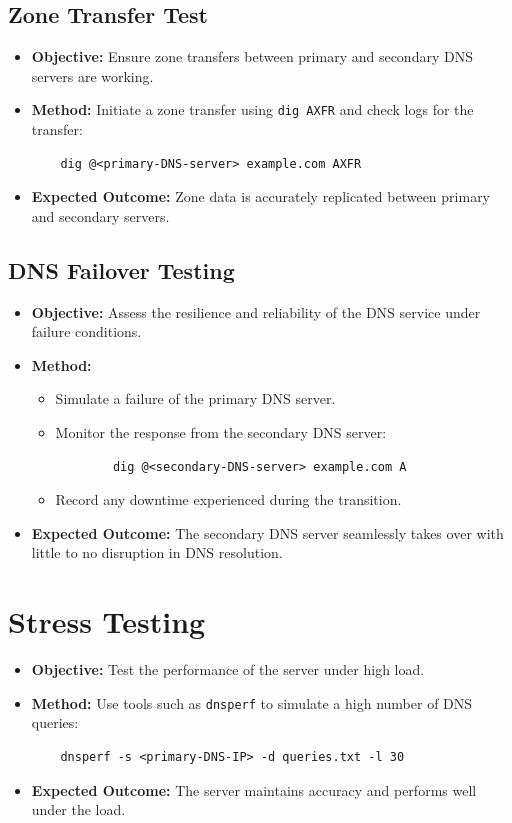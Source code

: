 \documentclass[a4paper,12pt]{article}
\begin{document}
\subsection*{Zone Transfer Test}
\begin{itemize}[leftmargin=1.5cm]
    \item \textbf{Objective:} Ensure zone transfers between primary and secondary DNS servers are working.
    \item \textbf{Method:} Initiate a zone transfer using \texttt{dig AXFR} and check logs for the transfer:
    \begin{verbatim}
    dig @<primary-DNS-server> example.com AXFR
    \end{verbatim}
    \item \textbf{Expected Outcome:} Zone data is accurately replicated between primary and secondary servers.
\end{itemize}

\subsection*{DNS Failover Testing}
\begin{itemize}[leftmargin=1.5cm]
    \item \textbf{Objective:} Assess the resilience and reliability of the DNS service under failure conditions.
    \item \textbf{Method:}
    \begin{itemize}
        \item Simulate a failure of the primary DNS server.
        \item Monitor the response from the secondary DNS server:
        \begin{verbatim}
        dig @<secondary-DNS-server> example.com A
        \end{verbatim}
        \item Record any downtime experienced during the transition.
    \end{itemize}
    \item \textbf{Expected Outcome:} The secondary DNS server seamlessly takes over with little to no disruption in DNS resolution.
\end{itemize}

\section*{Stress Testing}
\begin{itemize}[leftmargin=1.5cm]
    \item \textbf{Objective:} Test the performance of the server under high load.
    \item \textbf{Method:} Use tools such as \texttt{dnsperf} to simulate a high number of DNS queries:
    \begin{verbatim}
    dnsperf -s <primary-DNS-IP> -d queries.txt -l 30
    \end{verbatim}
    \item \textbf{Expected Outcome:} The server maintains accuracy and performs well under the load.
\end{itemize}
\end{document}
